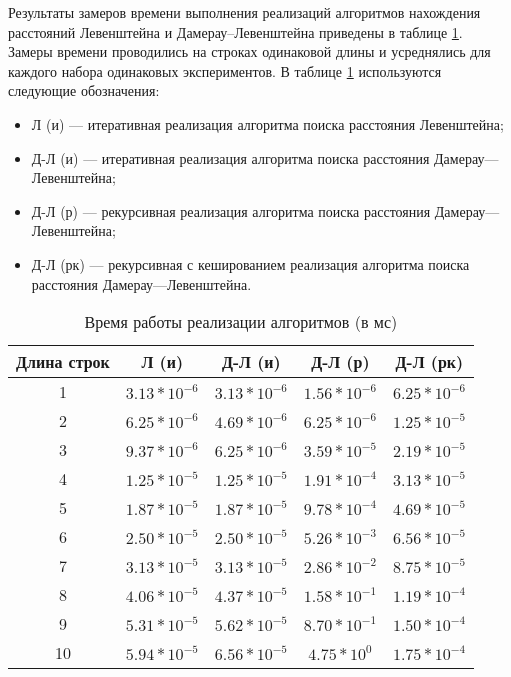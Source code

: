 Результаты замеров времени выполнения реализаций алгоритмов нахождения расстояний
Левенштейна и Дамерау–Левенштейна приведены в таблице \ref{tbl:time_measurements}.
Замеры времени проводились на строках одинаковой длины и усреднялись для каждого набора одинаковых экспериментов.
В таблице \ref{tbl:time_measurements} используются следующие обозначения: 
\begin{itemize}
	\item Л (и) --- итеративная реализация алгоритма поиска расстояния Левенштейна;
	\item Д-Л (и) --- итеративная реализация алгоритма поиска расстояния Дамерау---Левенштейна;
	\item Д-Л (р) --- рекурсивная реализация алгоритма поиска расстояния Дамерау---Левенштейна;
	\item Д-Л (рк) --- рекурсивная с кешированием реализация алгоритма поиска расстояния Дамерау---Левенштейна.
\end{itemize}

\begin{table}[h]
	\begin{center}
		\begin{threeparttable}
			\captionsetup{justification=raggedright,singlelinecheck=off}
			\caption{Время работы реализации алгоритмов (в мс)}
			\label{tbl:time_measurements}
			\begin{tabular}{|c|c|c|c|c|}
				\hline
				Длина строк &  Л (и)  & Д-Л (и) & Д-Л (р) & Д-Л (рк) \\
				\hline
				1 &$ 3.13* 10^{-6} $&$ 3.13* 10^{-6} $&$ 1.56* 10^{-6} $&$ 6.25* 10^{-6}$\\
				\hline
				2 &$ 6.25* 10^{-6} $&$ 4.69* 10^{-6} $&$ 6.25* 10^{-6} $&$ 1.25* 10^{-5}$\\
				\hline
				3 &$ 9.37* 10^{-6} $&$ 6.25* 10^{-6} $&$ 3.59* 10^{-5} $&$ 2.19* 10^{-5}$\\
				\hline
				4 &$ 1.25* 10^{-5} $&$ 1.25* 10^{-5} $&$ 1.91* 10^{-4} $&$ 3.13* 10^{-5}$\\
				\hline
				5 &$ 1.87* 10^{-5} $&$ 1.87* 10^{-5} $&$ 9.78* 10^{-4} $&$ 4.69* 10^{-5}$\\
				\hline
				6 &$ 2.50* 10^{-5} $&$ 2.50* 10^{-5} $&$ 5.26* 10^{-3} $&$ 6.56* 10^{-5}$\\
				\hline
				7 &$ 3.13* 10^{-5} $&$ 3.13* 10^{-5} $&$ 2.86* 10^{-2} $&$ 8.75* 10^{-5}$\\
				\hline
				8 &$ 4.06* 10^{-5} $&$ 4.37* 10^{-5} $&$ 1.58* 10^{-1} $&$ 1.19* 10^{-4}$\\
				\hline
				9 &$ 5.31* 10^{-5} $&$ 5.62* 10^{-5} $&$ 8.70* 10^{-1} $&$ 1.50* 10^{-4}$\\
				\hline
				10 &$ 5.94* 10^{-5} $&$ 6.56* 10^{-5} $&$ 4.75* 10^{0} $&$ 1.75* 10^{-4}$\\
				\hline
				
				
			\end{tabular}
		\end{threeparttable}
	\end{center}
\end{table}

